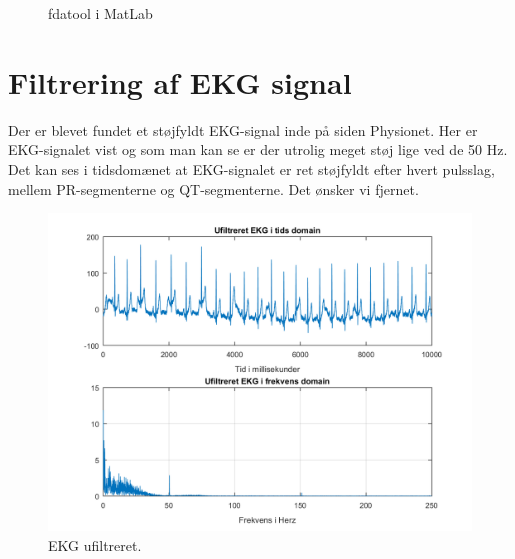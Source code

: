 \documentclass[12pt, letterpaper]{article}
\begin{document}
\begin{figure}[!h]
           \begin{floatrow}
             		   			{\caption{fdatool i MatLab}}
           \end{floatrow}
\end{figure}



\section{Filtrering af EKG signal}

Der er blevet fundet et støjfyldt EKG-signal inde på siden Physionet. Her er EKG-signalet vist og som man kan se er der utrolig meget støj lige ved de 50 Hz. Det kan ses i tidsdomænet at EKG-signalet er ret støjfyldt efter hvert pulsslag, mellem PR-segmenterne og QT-segmenterne. Det ønsker vi fjernet. 

\begin{figure}[H]
           \includegraphics[width=\linewidth]{billeder/EKGufiltreret}	   							\caption{EKG ufiltreret.}
\end{figure}
\end{document}
